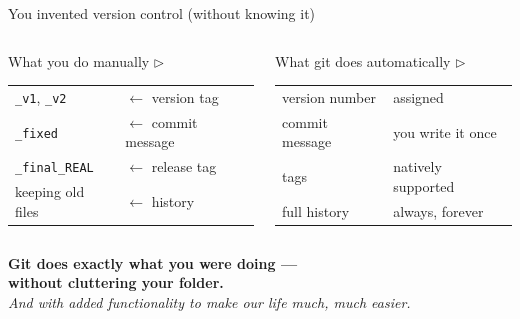 \documentclass[aspectratio=169]{beamer}
\begin{document}
\begin{frame}{You invented version control (without knowing it)}
    \begin{columns}
            \begin{block}{What you do manually $\triangleright$}
                \begin{tabular}{ll}
                    \texttt{\_v1}, \texttt{\_v2}      & $\leftarrow$ version tag    \\[4pt]
                    \texttt{\_fixed}                   & $\leftarrow$ commit message \\[4pt]
                    \texttt{\_final\_REAL}             & $\leftarrow$ release tag    \\[4pt]
                    keeping old files                  & $\leftarrow$ history        \\
                \end{tabular}
            \end{block}
            \pause
            \begin{block}{What git does automatically $\triangleright$}
                \begin{tabular}{ll}
                    version number     & assigned           \\[4pt]
                    commit message     & you write it once  \\[4pt]
                    tags               & natively supported \\[4pt]
                    full history       & always, forever    \\
                \end{tabular}
            \end{block}
    \end{columns}
    \vspace{1.2em}
    \pause
    \centering
    \textbf{Git does exactly what you were doing ---\\
    without cluttering your folder.}\\[6pt]
    \pause
    \textit{And with added functionality to make our life much, much easier.}
\end{frame}

\end{document}

